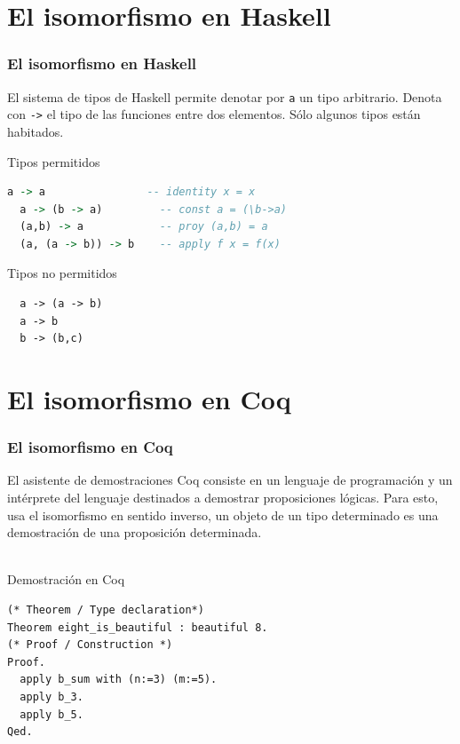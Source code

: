 \documentclass{beamer}
\begin{document}

\section{El isomorfismo en Haskell}
\begin{frame}[fragile] %
  \frametitle{El isomorfismo en Haskell}
  El sistema de tipos de Haskell permite denotar por \texttt{a} un
  tipo arbitrario. Denota con \texttt{->} el tipo de las funciones entre
  dos elementos. Sólo algunos tipos están habitados.
  \begin{block}{Tipos permitidos}
  \begin{lstlisting}[language=Haskell]
  a -> a                -- identity x = x
  a -> (b -> a)         -- const a = (\b->a)
  (a,b) -> a            -- proy (a,b) = a
  (a, (a -> b)) -> b    -- apply f x = f(x) \end{lstlisting}
  \end{block}
  \begin{block}{Tipos no permitidos}
    \begin{lstlisting}
  a -> (a -> b)
  a -> b
  b -> (b,c)
    \end{lstlisting}
  \end{block}
\end{frame}

  
\section{El isomorfismo en Coq}
\begin{frame}[fragile]
  \frametitle{El isomorfismo en Coq}
    El asistente de demostraciones Coq consiste en un lenguaje de
    programación y un intérprete del lenguaje destinados a demostrar
    proposiciones lógicas. Para esto, usa el isomorfismo en sentido inverso,
    un objeto de un tipo determinado es una demostración de una proposición
    determinada. \\~\\
    
    \begin{block}{Demostración en Coq}
     \begin{lstlisting}[language=Coq]
(* Theorem / Type declaration*)
Theorem eight_is_beautiful : beautiful 8.
(* Proof / Construction *)
Proof.
  apply b_sum with (n:=3) (m:=5).
  apply b_3.
  apply b_5.
Qed.
     \end{lstlisting}

    \end{block}

 
\end{frame}
\end{document}
